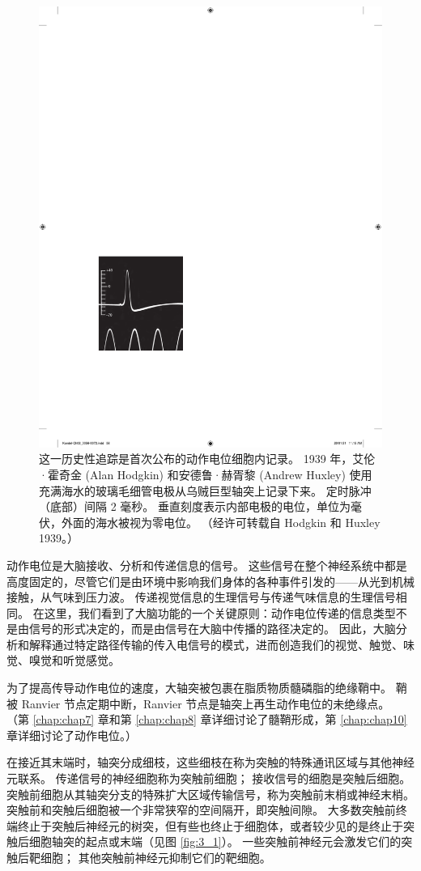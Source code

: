 \begin{figure}[htbp]
	\centering
	\includegraphics[width=0.5\linewidth]{chap03/fig_3_2}
	\caption{这一历史性追踪是首次公布的动作电位细胞内记录。 
		1939 年，艾伦·霍奇金 (Alan Hodgkin) 和安德鲁·赫胥黎 (Andrew Huxley) 使用充满海水的玻璃毛细管电极从乌贼巨型轴突上记录下来。 
		定时脉冲（底部）间隔 2 毫秒。 
		垂直刻度表示内部电极的电位，单位为毫伏，外面的海水被视为零电位。 
		（经许可转载自 Hodgkin 和 Huxley 1939。）}
	\label{fig:3_2}
\end{figure}


动作电位是大脑接收、分析和传递信息的信号。 
这些信号在整个神经系统中都是高度固定的，尽管它们是由环境中影响我们身体的各种事件引发的——从光到机械接触，从气味到压力波。 
传递视觉信息的生理信号与传递气味信息的生理信号相同。 
在这里，我们看到了大脑功能的一个关键原则：动作电位传递的信息类型不是由信号的形式决定的，而是由信号在大脑中传播的路径决定的。 
因此，大脑分析和解释通过特定路径传输的传入电信号的模式，进而创造我们的视觉、触觉、味觉、嗅觉和听觉感觉。


为了提高传导动作电位的速度，大轴突被包裹在脂质物质髓磷脂的绝缘鞘中。 
鞘被 Ranvier 节点定期中断，Ranvier 节点是轴突上再生动作电位的未绝缘点。 
（第 \ref{chap:chap7} 章和第 \ref{chap:chap8} 章详细讨论了髓鞘形成，第 \ref{chap:chap10} 章详细讨论了动作电位。）


在接近其末端时，轴突分成细枝，这些细枝在称为突触的特殊通讯区域与其他神经元联系。 
传递信号的神经细胞称为突触前细胞； 接收信号的细胞是突触后细胞。 
突触前细胞从其轴突分支的特殊扩大区域传输信号，称为突触前末梢或神经末梢。 
突触前和突触后细胞被一个非常狭窄的空间隔开，即突触间隙。 
大多数突触前终端终止于突触后神经元的树突，但有些也终止于细胞体，或者较少见的是终止于突触后细胞轴突的起点或末端（见图 \ref{fig:3_1}）。 
一些突触前神经元会激发它们的突触后靶细胞； 其他突触前神经元抑制它们的靶细胞。


